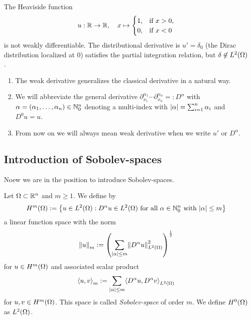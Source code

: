 \begin{example}
	The Heaviside function
	\[
		u: \R \to \R, \quad x \mapsto \begin{cases}
			1, & \text{if }x > 0,\\
			0, & \text{if }x < 0
		\end{cases}
	\]
	is not weakly differentiable.
	The distributional derivative is \(u' = \delta_0\) (the Dirac distribution localized at \(0\)) satisfies the partial integration relation, but \(\delta \not\in L^2\parentheses*{\Omega}\).
\end{example}

\begin{remark}
	\begin{enumerate}
		\item The weak derivative generalizes the classical derivative in a natural way.
		\item We will abbreviate the general derivative \(\partial_{x_1}^{\alpha_1}\cdots\partial_{x_n}^{\alpha_n} =: D^\alpha\) with \(\alpha = \parentheses*{\alpha_1, \ldots, \alpha_n} \in \N_0^n\) denoting a multi-index with \(\absolute*{\alpha} = \sum_{i = 1}^n \alpha_i\) and \(D^0 u = u\).
		\item From now on we will always mean weak derivative when we write \(u'\) or \(D^\alpha\).
	\end{enumerate}
\end{remark}


\subsection{Introduction of Sobolev-spaces}

Noew we are in the position to introduce Sobolev-spaces.

\begin{definition}
	Let \(\Omega \subset \R^n\) and \(m \ge 1\).
	We define by
	\[
		H^m\parentheses*{\Omega} := \braces*{u \in L^2\parentheses*{\Omega} : D^\alpha u \in L^2\parentheses*{\Omega}\text{ for all }\alpha \in \N_0^n\text{ with }\absolute*{\alpha} \le m}
	\]
	a linear function space with the norm
	\[
		\norm*{u}_m := \parentheses*{\sum_{\absolute*{\alpha} \le m}\norm*{D^\alpha u}_{L^2\parentheses*{\Omega}}^2}^{\frac{1}{2}}
	\]
	for \(u \in H^m\parentheses*{\Omega}\) and associated scalar product
	\[
		\angles*{u, v}_m := \sum_{\absolute*{\alpha} \le m}\angles*{D^\alpha u, D^\alpha v}_{L^2\parentheses*{\Omega}}
	\]
	for \(u, v \in H^m\parentheses*{\Omega}\).
	This space is called \emph{Sobolev-space} of order \(m\).
	We define \(H^0\parentheses*{\Omega}\) as \(L^2\parentheses*{\Omega}\).
\end{definition}

